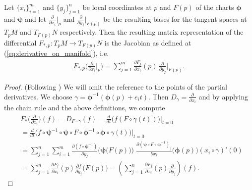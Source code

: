 \documentclass[../master_thesis.tex]{subfiles}
\begin{document}
\begin{proposition}
    Let $\{x_i\}_{i=1}^m$ and $\{y_j\}_{j=1}^n$ be local coordinates at 
    $p$ and $F(p)$ of the charts $\bm{\phi}$ and $\bm{\psi}$ and let $\frac{\partial}{\partial x_i}|_p$ and 
    $\frac{\partial}{\partial y_j}|_{F(p)}$ be the resulting bases for the 
    tangent spaces at $T_p M$ and $T_{F(p)} N$ respectively. Then 
    the resulting matrix representation of the differential 
    $F_{*,p}:T_p M \rightarrow 
    T_{F(p)}N$ is the Jacobian as defined at (\ref{eq:derivative_on_manifold}), i.e.
    \begin{align*}
        F_{*,p} \bigg( \frac{\partial}{\partial x_i}\Big|_p \bigg)
        = \sum_{j=1}^m \frac{\partial F_j}{\partial x_i}(p)\,
            \frac{\partial}{\partial y_j}\Big|_{F(p)}. 
    \end{align*}
\end{proposition}
\begin{proof}
    (Following \cite[p.79]{topology_and_geometry})
    We will omit the reference to the points of the partial derivatives.
    We choose $\gamma = \boldsymbol{\phi}^{-1}(\boldsymbol{\phi}(p) + e_i t)$. Then 
    $D_\gamma = \frac{\partial}{\partial x_i}$ and by applying the chain 
    rule and the above definitions, we compute
    \begin{align*}
        &F_{*}\bigg(\frac{\partial}{\partial x_i}\bigg)(f)
        = D_{F\circ \gamma}(f)
        = \frac{d}{dt} \big(f(F \circ \gamma(t) ) \big)|_{t=0} 
        \\ &= \frac{d}{dt} \big(f \circ \boldsymbol{\psi}^{-1} \circ \boldsymbol{\psi}   
            \circ F \circ \boldsymbol{\phi}^{-1} \circ \boldsymbol{\phi} \circ \gamma(t)  \big)|_{t=0}
        \\ &= \sum_{j=1}^n \sum_{i=1}^m \frac{\partial (f \circ \boldsymbol{\psi}^{-1})}{\partial y_j}
            \Big(\boldsymbol{\psi}\big(F(p)\big)\Big) \; 
            \frac{\partial (\boldsymbol{\psi} \circ F \circ \boldsymbol{\phi}^{-1})_j}{\partial x_i}
            \big(\boldsymbol{\phi}(p)\big)  (x_i \circ \gamma)'(0)
        \\ &= \sum_{j=1}^n \frac{\partial F_j}{\partial x_i}(p) 
            \frac{\partial f}{\partial y_j}\big(F(p)\big)
        = \left( \sum_{j=1}^n \frac{\partial F_j}{\partial x_i}(p) 
            \frac{\partial}{\partial y_j} \right) (f).
    \end{align*} 
\end{proof}
\end{document}
